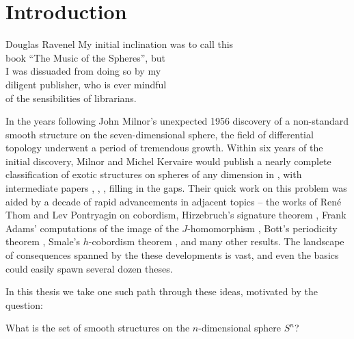 \chapter{Introduction}\label{chap:introduction}

\begin{epigraph}{17em}{Douglas Ravenel}
  My initial inclination was to call this\\
  book ``The Music of the Spheres'', but\\
  I was dissuaded from doing so by my \\
  diligent publisher, who is ever mindful \\
  of the sensibilities of librarians.
\end{epigraph}

In the years following John Milnor's unexpected 1956 discovery \cite{milnor1956manifolds} of a non-standard smooth structure on the seven-dimensional sphere, the field of differential topology underwent a period of tremendous growth. Within six years of the initial discovery, Milnor and Michel Kervaire would publish a nearly complete classification of exotic structures on spheres of any dimension in \cite{milnorkervaire1963groups}, with intermediate papers \cite{milnor1958manifolds}, \cite{milnorkervaire1960bernoulli}, \cite{milnor1959differentiablestructures}, \cite{milnor1961procedure} filling in the gaps.
Their quick work on this problem was aided by a decade of rapid advancements in adjacent topics -- the works of Ren\'e Thom \cite{thom1954} and Lev Pontryagin \cite{pontryagin1959homotopy} on cobordism, Hirzebruch's signature theorem \cite{hirzebruch1966methods}, Frank Adams' computations of the image of the $J$-homomorphism \cite{adams1966J}, Bott's periodicity theorem \cite{bott1959stable}, Smale's $h$-cobordism theorem \cite{smale1961generalized}, and many other results. 
The landscape of consequences spanned by the these developments is vast, and even the basics could easily spawn several dozen theses.

In this thesis we take one such path through these ideas, motivated by the question:

\begin{question*}
  What is the set of smooth structures on the $n$-dimensional sphere $S^n$?
\end{question*}

